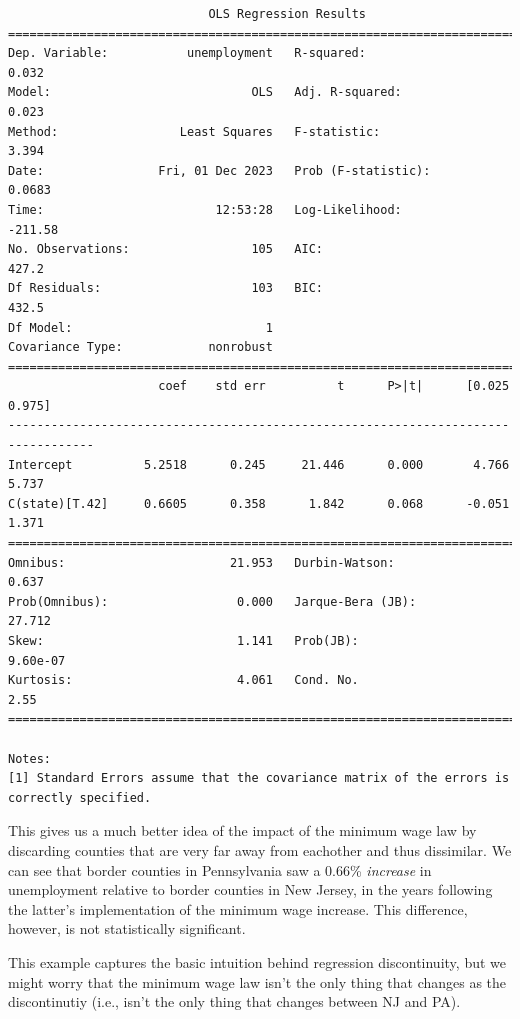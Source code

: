 \documentclass[
  letterpaper,
  DIV=11,
  numbers=noendperiod]{scrreprt}
\begin{document}
\begin{verbatim}
                            OLS Regression Results                            
==============================================================================
Dep. Variable:           unemployment   R-squared:                       0.032
Model:                            OLS   Adj. R-squared:                  0.023
Method:                 Least Squares   F-statistic:                     3.394
Date:                Fri, 01 Dec 2023   Prob (F-statistic):             0.0683
Time:                        12:53:28   Log-Likelihood:                -211.58
No. Observations:                 105   AIC:                             427.2
Df Residuals:                     103   BIC:                             432.5
Df Model:                           1                                         
Covariance Type:            nonrobust                                         
==================================================================================
                     coef    std err          t      P>|t|      [0.025      0.975]
----------------------------------------------------------------------------------
Intercept          5.2518      0.245     21.446      0.000       4.766       5.737
C(state)[T.42]     0.6605      0.358      1.842      0.068      -0.051       1.371
==============================================================================
Omnibus:                       21.953   Durbin-Watson:                   0.637
Prob(Omnibus):                  0.000   Jarque-Bera (JB):               27.712
Skew:                           1.141   Prob(JB):                     9.60e-07
Kurtosis:                       4.061   Cond. No.                         2.55
==============================================================================

Notes:
[1] Standard Errors assume that the covariance matrix of the errors is correctly specified.
\end{verbatim}

This gives us a much better idea of the impact of the minimum wage law
by discarding counties that are very far away from eachother and thus
dissimilar. We can see that border counties in Pennsylvania saw a 0.66\%
\emph{increase} in unemployment relative to border counties in New
Jersey, in the years following the latter's implementation of the
minimum wage increase. This difference, however, is not statistically
significant.

This example captures the basic intuition behind regression
discontinuity, but we might worry that the minimum wage law isn't the
only thing that changes as the discontinutiy (i.e., isn't the only thing
that changes between NJ and PA).
\end{document}
